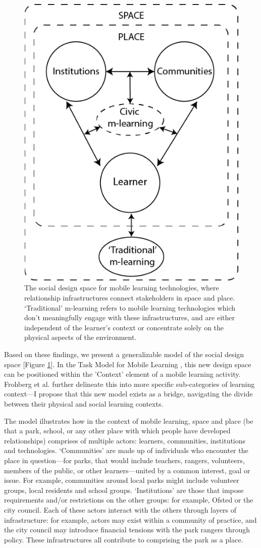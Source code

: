 \begin{figure}
  \centering
  \includegraphics[width=0.45\columnwidth]{images/chapter04/designSpace.png}
  \caption[The social design space for mobile learning technologies]{The social design space for mobile learning technologies, where relationship infrastructures connect stakeholders in space and place. `Traditional' m-learning refers to mobile learning technologies which don’t meaningfully engage with these infrastructures, and are either independent of the learner’s context or concentrate solely on the physical aspects of the environment.}
  \label{fig:designSpace}
\end{figure}

Based on these findings, we present a generalizable model of the social design space [Figure \ref{fig:designSpace}]. In the Task Model for Mobile Learning \citep{Taylor2006}, this new design space can be positioned within the 'Context' element of a mobile learning activity. Frohberg et al. further delineate this into more specific sub-categories of learning context---I propose that this new model exists as a bridge, navigating the divide between their physical and social learning contexts.

The model illustrates how in the context of mobile learning, space and place (be that a park, school, or any other place with which people have developed relationships) comprises of multiple actors: learners, communities, institutions and technologies. `Communities' are made up of individuals who encounter the place in question---for parks, that would include teachers, rangers, volunteers, members of the public, or other learners---united by a common interest, goal or issue. For example, communities around local parks might include volunteer groups, local residents and school groups. `Institutions' are those that impose requirements and/or restrictions on the other groups: for example, Ofsted or the city council. Each of these actors interact with the others through layers of infrastructure: for example, actors may exist within a community of practice, and the city council may introduce financial tensions with the park rangers through policy. These infrastructures all contribute to comprising the park as a place.

